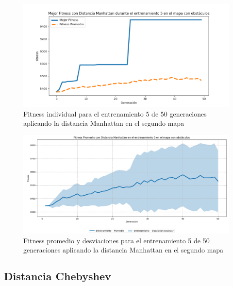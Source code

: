 \documentclass[conference]{IEEEtran}
\begin{document}
\begin{figure}[H]
    \centering
    \includegraphics[width=0.9 \linewidth]{Manhattan/Mapa2/Fitness_5_Map2_Manh_50Gen.png}
    \caption{Fitness individual para el entrenamiento 5 de 50 generaciones aplicando la distancia Manhattan en el segundo mapa}
    \label{fig:manh_5_50_m2}
\end{figure}
\begin{figure}[H]
    \centering
    \includegraphics[width=0.9 \linewidth]{Manhattan/Mapa2/Fitness_5_Map2_Manh_50Gen_Sombra.png}
    \caption{Fitness promedio y desviaciones para el entrenamiento 5 de 50 generaciones aplicando la distancia Manhattan en el segundo mapa}
    \label{fig:manh_5_50_sombra_m2}
\end{figure}

\subsection{Distancia Chebyshev}
\setcounter{figure}{0}
\renewcommand{\thefigure}{S\arabic{figure}-CM2}
\end{document}
